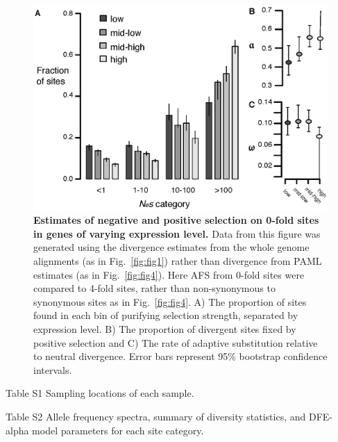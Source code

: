 \begin{figure}[h!]
      \centering
       \includegraphics[width=\linewidth]{Ch2FigS11}
    \caption{\textbf{Estimates of negative and positive selection on 0-fold sites in genes of varying expression level.} Data from this figure was generated using the divergence estimates from the whole genome alignments (as in Fig.~\ref{fig:fig1}) rather than divergence from PAML estimates (as in Fig.~\ref{fig:fig4}). Here AFS from 0-fold sites were compared to 4-fold sites, rather than non-synonymous to synonymous sites as in Fig.~\ref{fig:fig4}. A) The proportion of sites found in each bin of purifying selection strength, separated by expression level. B) The proportion of divergent sites fixed by positive selection and C) The rate of adaptive substitution relative to neutral divergence. Error bars represent 95\% bootstrap confidence intervals.}
    \label{fig:figS11}
\end{figure}

Table S1
Sampling locations of each sample.

Table S2
Allele frequency spectra, summary of diversity statistics, and DFE-alpha model parameters for each site category. 

